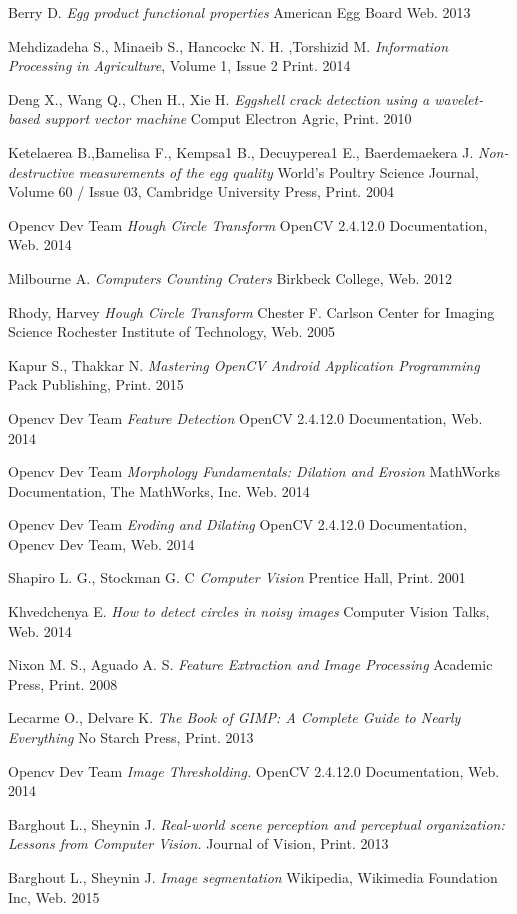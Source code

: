 \documentclass[12pt,twoside,a4paper]{article}
\begin{document}
\begin{thebibliography}{9}
 
Berry D.
\textit{Egg product functional properties} 
American Egg Board Web. 2013

Mehdizadeha S., Minaeib S., Hancockc N. H. ,Torshizid M.
\textit{Information Processing in Agriculture}, Volume 1, Issue 2 
Print. 2014

Deng X., Wang Q., Chen H., Xie H.
\textit{Eggshell crack detection using a wavelet-based support vector machine} Comput Electron Agric, Print. 2010

Ketelaerea B.,Bamelisa F., Kempsa1 B., Decuyperea1 E., Baerdemaekera J.
\textit{Non-destructive measurements of the egg quality} World's Poultry Science Journal, Volume 60 / Issue 03,  Cambridge University Press, Print. 2004
 
Opencv Dev Team
\textit{Hough Circle Transform} OpenCV 2.4.12.0 Documentation, Web. 2014

Milbourne A.
\textit{Computers Counting Craters} Birkbeck College, Web. 2012

Rhody, Harvey
\textit{Hough Circle Transform} Chester F. Carlson Center for Imaging Science Rochester Institute of Technology, Web. 2005

Kapur S., Thakkar N.
\textit{Mastering OpenCV Android Application Programming} Pack Publishing, Print. 2015

Opencv Dev Team
\textit{Feature Detection} OpenCV 2.4.12.0 Documentation, Web. 2014

Opencv Dev Team
\textit{Morphology Fundamentals: Dilation and Erosion} MathWorks Documentation, The MathWorks, Inc. Web. 2014

Opencv Dev Team
\textit{Eroding and Dilating} OpenCV 2.4.12.0 Documentation, Opencv Dev Team, Web. 2014

Shapiro L. G., Stockman G. C
\textit{Computer Vision} Prentice Hall, Print. 2001

Khvedchenya E.
\textit{How to detect circles in noisy images} Computer Vision Talks, Web. 2014

Nixon M. S., Aguado A. S.
\textit{Feature Extraction and Image Processing} Academic Press, Print. 2008

Lecarme  O., Delvare K.
\textit{The Book of GIMP: A Complete Guide to Nearly Everything} No Starch Press, Print. 2013

Opencv Dev Team
\textit{Image Thresholding.} OpenCV 2.4.12.0 Documentation, Web. 2014

Barghout L., Sheynin J.
\textit{Real-world scene perception and perceptual organization: Lessons from Computer Vision.} Journal of Vision, Print. 2013

Barghout L., Sheynin J.
\textit{Image segmentation} Wikipedia, Wikimedia Foundation Inc, Web. 2015

\end{thebibliography}
\end{document}

